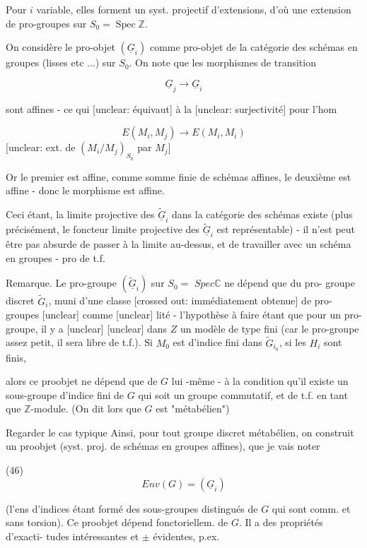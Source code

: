 Pour $i$ variable, elles forment un syst.
projectif d'extensions, d'où une
extension de pro-groupes sur $S_0 = \operatorname{Spec} \mathbb{Z}$.

On considère le pro-objet $(\underline{G}_i)$
comme pro-objet de la catégorie des
schémas en groupes (lisses etc ...)
sur $S_0$. On note que les morphismes
de transition

$$\underline{G}_j \to \underline{G}_i$$

sont affines - ce qui [unclear: équivaut] à la [unclear: surjectivité] pour l'hom

$$E(M_i, M_j) \to E(M_i, M_i)$$
[unclear: ext. de $(M_i/M_j)_{S_0}$ par $M_j$]

\newpage


Or le premier est affine, comme somme
finie de schémas affines, le deuxième
est affine - donc le morphisme
est affine.

Ceci étant, la limite projective des
$\underline{\tilde{G}}_i$ dans la catégorie des schémas existe
(plus précisément, le foncteur limite
projective des $\underline{\tilde{G}}_i$ est représentable) -
il n'est peut être pas absurde de passer
à la limite au-dessus, et de travailler
avec un schéma en groupes - pro de
t.f.

Remarque. Le pro-groupe $(\underline{\tilde{G}}_i)$ sur $S_0 =$
$Spec \mathbb{C}$ ne dépend que du pro-
groupe discret $\tilde{G}_i$, muni d'une classe
[crossed out: immédiatement obtenue]
de pro-groupes [unclear] comme [unclear]
lité - l'hypothèse à faire étant que
pour un pro-groupe, il y a [unclear]
[unclear] dans $Z$ un modèle de type fini
(car le pro-groupe assez petit, il sera libre
de t.f.). Si $M_0$ est d'indice
fini dans $\tilde{G}_{i_0}$, si les $H_i$ sont finis,

\newpage


alors ce proobjet ne dépend que de $G$ lui
-même - à la condition qu'il existe
un sous-groupe d'indice fini de $G$ qui
soit un groupe commutatif, et de t.f. en
tant que $\mathbb{Z}$-module. (On dit lors
que $G$ est "métabélien")

Regarder le cas typique
Ainsi, pour tout groupe discret
métabélien, on construit un proobjet
(syst. proj. de schémas en groupes affines),
que je vais noter

(46) $$Env(G) = (\underline{G}_i)$$

(l'ens d'indices étant formé des sous-groupes
distingués de $G$ qui sont comm. et sans
torsion). Ce proobjet dépend fonctoriellem.
de $G$. Il a des propriétés d'exacti-
tudes intéressantes et $\pm$ évidentes, p.ex.

